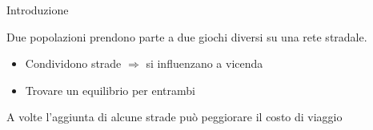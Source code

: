 \begin{frame}{Introduzione}

\begin{center}
\Large
Due popolazioni prendono parte a due giochi diversi su una rete stradale.
\end{center}

\vspace{0.5cm}

\begin{itemize}
\item Condividono strade $\Rightarrow$ si influenzano a vicenda
\item Trovare un equilibrio per entrambi
\end{itemize}

\vspace{0.5cm}

\begin{center}
\begin{alertblock}{}
A volte l'aggiunta di alcune strade può peggiorare il costo di viaggio
\end{alertblock}
\end{center}

\end{frame}
